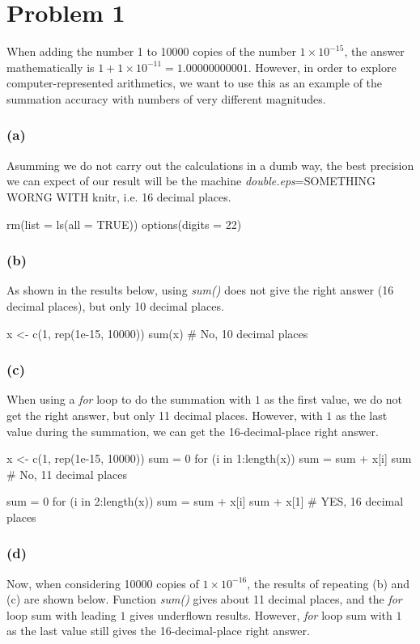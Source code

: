 \documentclass{article}
\newcommand{\rinline}[1]{SOMETHING WORNG WITH knitr}
\begin{document}
\section*{Problem 1}

When adding the number 1 to 10000 copies of the number $1 \times 10^{-15}$, the answer mathematically is \newline
$1 + 1 \times 10^{-11} = 1.00000000001$. However, in order to explore computer-represented arithmetics, 
we want to use this as an example of the summation accuracy with numbers of very different magnitudes.

\subsubsection*{(a)}
Asumming we do not carry out the calculations in a dumb way, the best precision we can expect of our result
will be the machine \textit{double.eps}=\rinline{.Machine$double.eps}, i.e. 16 decimal places.

rm(list = ls(all = TRUE)) 
options(digits = 22)

\subsubsection*{(b)}
As shown in the results below, using \textit{sum()} does not give the right answer (16 decimal places), but only
10 decimal places.

x <- c(1, rep(1e-15, 10000))
sum(x) # No, 10 decimal places

\subsubsection*{(c)}
When using a \textit{for} loop to do the summation with $1$ as the first value, we do not get the right answer,
but only 11 decimal places. However, with $1$ as the last value during the summation, we can get the 16-decimal-place
right answer.

x <- c(1, rep(1e-15, 10000))
sum = 0
for (i in 1:length(x))  sum = sum + x[i]
sum # No, 11 decimal places

sum = 0
for (i in 2:length(x))  sum = sum + x[i]
sum + x[1] # YES, 16 decimal places

\subsubsection*{(d)}
Now, when considering 10000 copies of $1 \times 10^{-16}$, the results of repeating (b) and (c) are shown below.
Function \textit{sum()} gives about 11 decimal places, and the \textit{for} loop sum with leading $1$ gives underflown results.
However, \textit{for} loop sum with $1$ as the last value still gives the 16-decimal-place right answer.
\end{document}
